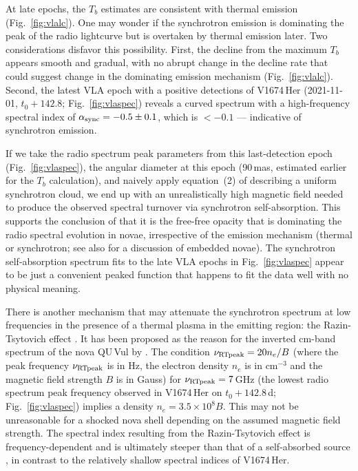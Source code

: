 \documentclass[a4paper,fleqn,usenatbib]{mnras}
\newcommand{\nova}{V1674\,Her}
\begin{document}
At late epochs, the $T_b$ estimates are consistent with 
thermal emission (Fig.~\ref{fig:vlalc}). One may wonder if the synchrotron
emission is dominating the peak of the radio lightcurve but is overtaken by
thermal emission later.
%
Two considerations disfavor this possibility.
First, the decline from the maximum $T_b$ appears smooth and gradual, with no abrupt
change in the decline rate that could suggest change in the dominating
emission mechanism (Fig.~\ref{fig:vlalc}).
%
Second, the latest VLA epoch with a positive detections of \nova{} 
(2021-11-01, $t_0+142.8$; Fig.~\ref{fig:vlaspec}) reveals a curved spectrum with a
high-frequency spectral index of $\alpha_{\rm sync} = -0.5 \pm 0.1$, which is $<-0.1$ --- indicative of synchrotron emission.

If we take the radio spectrum peak parameters from this last-detection epoch 
(Fig.~\ref{fig:vlaspec}), the angular diameter at this epoch (90\,mas, 
estimated earlier for the $T_b$ calculation), and naively apply equation~(2) of 
\cite{1983ApJ...264..296M} describing a uniform synchrotron cloud, 
we end up with an unrealistically high magnetic field
needed to produce the observed spectral turnover via synchrotron 
self-absorption. This supports the conclusion of \cite{2016MNRAS.463..394V} that 
it is the free-free opacity that is dominating the radio spectral evolution in novae,
irrespective of the emission mechanism (thermal or synchrotron; see
also \citealt{2016MNRAS.456L..49K} for a discussion of embedded novae).
%
The synchrotron self-absorption 
spectrum fits to the late VLA epochs in Fig.~\ref{fig:vlaspec}
appear to be just a convenient peaked function that happens to fit the data
well with no physical meaning. 

There is another mechanism that may attenuate the synchrotron spectrum at low
frequencies in the presence of a thermal plasma in the emitting region: 
the Razin-Tsytovich effect \citep{1965ARA&A...3..297G,1966AuJPh..19..195K,1979rpa..book.....R}. 
It has been proposed as the reason for the inverted cm-band spectrum of the nova QU\,Vul by \cite{1987A&A...183...38T}. 
The condition $\nu_{\rm RT peak} = 20 n_e/B$ (where the peak
frequency $\nu_{\rm RT peak}$ is in Hz, the electron density $n_e$ is in cm$^{-3}$ 
and the magnetic field strength $B$ is in Gauss) for 
$\nu_{\rm RT peak} = 7$\,GHz (the lowest radio spectrum peak frequency
observed in \nova{} on $t_0+142.8$\,d; Fig.~\ref{fig:vlaspec}) implies a density $n_e = 3.5\times10^8 B$.
This may not be unreasonable for a shocked nova shell \citep[][c.f.~\S~\ref{sec:thermalradiofromxrayplasma}]{1987A&A...183...38T,2016MNRAS.463..394V} 
depending on the assumed magnetic field strength. 
The spectral index resulting from the Razin-Tsytovich effect is 
frequency-dependent and is ultimately steeper than that of a self-absorbed
source \citep[according to figure~1 of][]{1966AuJPh..19..195K}, 
in contrast to the relatively shallow spectral indices of \nova{}. 
\end{document}
